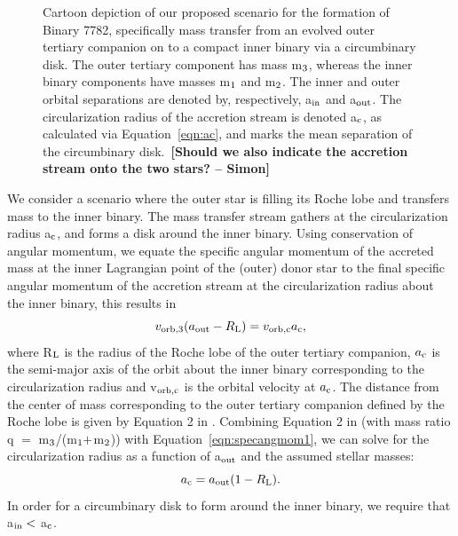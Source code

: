 \documentclass{aastex62}
\def\simon#1{{\bf {\color{red}[#1 -- Simon]}}}
\begin{document}
\begin{figure}[ht!]
\caption{Cartoon depiction of our proposed scenario for the formation
  of Binary 7782, specifically mass transfer from an evolved outer
  tertiary companion on to a compact inner binary via a circumbinary
  disk.  The outer tertiary component has mass m$_{\rm 3}$, whereas
  the inner binary components have masses m$_{\rm 1}$ and m$_{\rm 2}$.
  The inner and outer orbital separations are denoted by,
  respectively, a$_{\rm in}$ and a$_{\rm out}$.  The circularization
  radius of the accretion stream is denoted a$_{\rm c}$, as calculated
  via Equation~\ref{eqn:ac}, and marks the mean separation of the
  circumbinary disk.\
  \simon{Should we also indicate the accretion stream onto the two stars?}
\label{fig:fig1}}
\end{figure}

We consider a scenario where the outer star is filling its Roche lobe
and transfers mass to the inner binary.  The mass transfer stream
gathers at the circularization radius a$_{\rm c}$, and forms a disk
around the inner binary.  Using conservation of angular momentum, we
equate the specific angular momentum of the accreted mass at the inner
Lagrangian point of the (outer) donor star to the final specific
angular momentum of the accretion stream at the circularization radius
about the inner binary, this results in
\begin{equation}
\label{eqn:specangmom1}
v_{\rm orb,3}(a_{\rm out} - R_{\rm L}) = v_{\rm orb,c}a_{\rm c},
\end{equation}
where R$_{\rm L}$ is the radius of the Roche lobe of the outer
tertiary companion, $a_{\rm c}$ is the semi-major axis of the orbit
about the inner binary corresponding to the circularization radius and
v$_{\rm orb,c}$ is the orbital velocity at $a_{\rm c}$.  The distance
from the center of mass corresponding to the outer tertiary companion
defined by the Roche lobe is given by Equation 2 in
\citep{eggleton83}.  Combining Equation 2 in \citet{eggleton83} (with
mass ratio q $=$ m$_{\rm 3}$/(m$_{\rm 1} +$m$_{\rm 2}$)) with
Equation~\ref{eqn:specangmom1}, we can solve for the circularization
radius as a function of a$_{\rm out}$ and the assumed stellar masses:
\begin{equation}
\label{eqn:ac}
a_{\rm c} = a_{\rm out}(1 - R_{\rm L}).
\end{equation}
In order for a circumbinary disk to form around the inner binary, we
require that a$_{\rm in} <$ a$_{\rm c}$.
\end{document}

